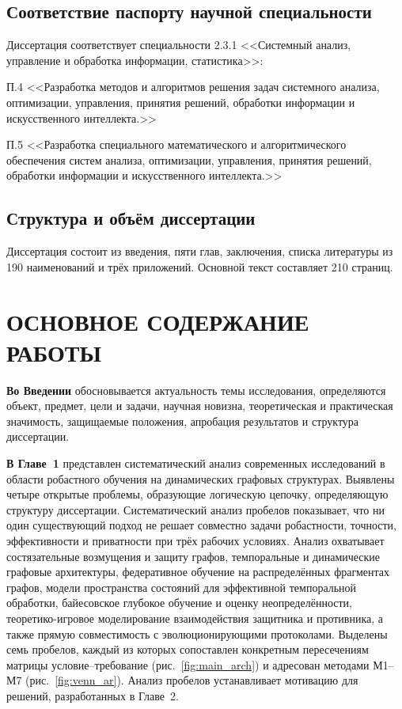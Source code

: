 \documentclass[12pt,a5paper]{article}
\begin{document}
\subsection*{Соответствие паспорту научной специальности}

Диссертация соответствует специальности 2.3.1 <<Системный анализ, управление и обработка информации, статистика>>:

\noindent П.4 <<Разработка методов и алгоритмов решения задач системного анализа, оптимизации, управления, принятия решений, обработки информации и искусственного интеллекта.>>

\noindent П.5 <<Разработка специального математического и алгоритмического обеспечения систем анализа, оптимизации, управления, принятия решений, обработки информации и искусственного интеллекта.>>

\subsection*{Структура и объём диссертации}

Диссертация состоит из введения, пяти глав, заключения, списка литературы из 190 наименований и трёх приложений. Основной текст составляет 210 страниц.

\section*{ОСНОВНОЕ СОДЕРЖАНИЕ РАБОТЫ}

\textbf{Во Введении} обосновывается актуальность темы исследования, определяются объект, предмет, цели и задачи, научная новизна, теоретическая и практическая значимость, защищаемые положения, апробация результатов и структура диссертации.

\textbf{В Главе~1} представлен систематический анализ современных исследований в области робастного обучения на динамических графовых структурах. Выявлены четыре открытые проблемы, образующие логическую цепочку, определяющую структуру диссертации. Систематический анализ пробелов показывает, что ни один существующий подход не решает совместно задачи робастности, точности, эффективности и приватности при трёх рабочих условиях. Анализ охватывает состязательные возмущения и защиту графов, темпоральные и динамические графовые архитектуры, федеративное обучение на распределённых фрагментах графов, модели пространства состояний для эффективной темпоральной обработки, байесовское глубокое обучение и оценку неопределённости, теоретико-игровое моделирование взаимодействия защитника и противника, а также прямую совместимость с эволюционирующими протоколами. Выделены семь пробелов, каждый из которых сопоставлен конкретным пересечениям матрицы условие--требование (рис.~\ref{fig:main_arch}) и адресован методами М1--М7 (рис.~\ref{fig:venn_ar}). Анализ пробелов устанавливает мотивацию для решений, разработанных в Главе~2.
\end{document}
